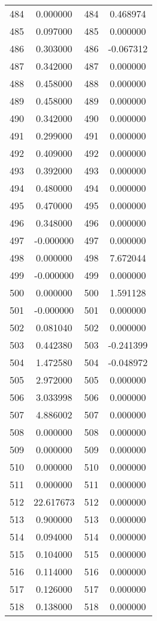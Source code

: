 \documentclass[12pt]{article}
\begin{document}
\begin{longtable}{@{}cccc@{}}
484 & 0.000000 & 484 & 0.468974 \\
485 & 0.097000 & 485 & 0.000000 \\
486 & 0.303000 & 486 & -0.067312 \\
487 & 0.342000 & 487 & 0.000000 \\
488 & 0.458000 & 488 & 0.000000 \\
489 & 0.458000 & 489 & 0.000000 \\
490 & 0.342000 & 490 & 0.000000 \\
491 & 0.299000 & 491 & 0.000000 \\
492 & 0.409000 & 492 & 0.000000 \\
493 & 0.392000 & 493 & 0.000000 \\
494 & 0.480000 & 494 & 0.000000 \\
495 & 0.470000 & 495 & 0.000000 \\
496 & 0.348000 & 496 & 0.000000 \\
497 & -0.000000 & 497 & 0.000000 \\
498 & 0.000000 & 498 & 7.672044 \\
499 & -0.000000 & 499 & 0.000000 \\
500 & 0.000000 & 500 & 1.591128 \\
501 & -0.000000 & 501 & 0.000000 \\
502 & 0.081040 & 502 & 0.000000 \\
503 & 0.442380 & 503 & -0.241399 \\
504 & 1.472580 & 504 & -0.048972 \\
505 & 2.972000 & 505 & 0.000000 \\
506 & 3.033998 & 506 & 0.000000 \\
507 & 4.886002 & 507 & 0.000000 \\
508 & 0.000000 & 508 & 0.000000 \\
509 & 0.000000 & 509 & 0.000000 \\
510 & 0.000000 & 510 & 0.000000 \\
511 & 0.000000 & 511 & 0.000000 \\
512 & 22.617673 & 512 & 0.000000 \\
513 & 0.900000 & 513 & 0.000000 \\
514 & 0.094000 & 514 & 0.000000 \\
515 & 0.104000 & 515 & 0.000000 \\
516 & 0.114000 & 516 & 0.000000 \\
517 & 0.126000 & 517 & 0.000000 \\
518 & 0.138000 & 518 & 0.000000 \\

\end{longtable}
\end{document}
